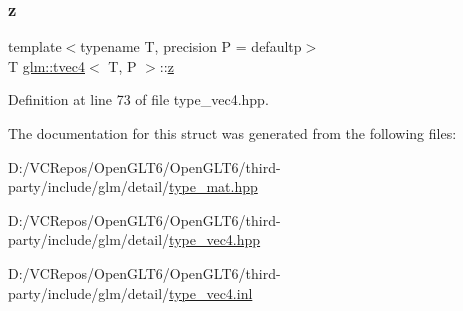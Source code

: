 \subsubsection{\texorpdfstring{z}{z}}
{\footnotesize\ttfamily template$<$typename T, precision P = defaultp$>$ \\
T \mbox{\hyperlink{structglm_1_1tvec4}{glm\+::tvec4}}$<$ T, P $>$\+::\mbox{\hyperlink{glad_8h_acb78bf1972d3eaf07da34ff2e0a2f133}{z}}}



Definition at line 73 of file type\+\_\+vec4.\+hpp.



The documentation for this struct was generated from the following files\+:\begin{DoxyCompactItemize}
\item 
D\+:/\+V\+C\+Repos/\+Open\+G\+L\+T6/\+Open\+G\+L\+T6/third-\/party/include/glm/detail/\mbox{\hyperlink{type__mat_8hpp}{type\+\_\+mat.\+hpp}}\item 
D\+:/\+V\+C\+Repos/\+Open\+G\+L\+T6/\+Open\+G\+L\+T6/third-\/party/include/glm/detail/\mbox{\hyperlink{type__vec4_8hpp}{type\+\_\+vec4.\+hpp}}\item 
D\+:/\+V\+C\+Repos/\+Open\+G\+L\+T6/\+Open\+G\+L\+T6/third-\/party/include/glm/detail/\mbox{\hyperlink{type__vec4_8inl}{type\+\_\+vec4.\+inl}}\end{DoxyCompactItemize}
